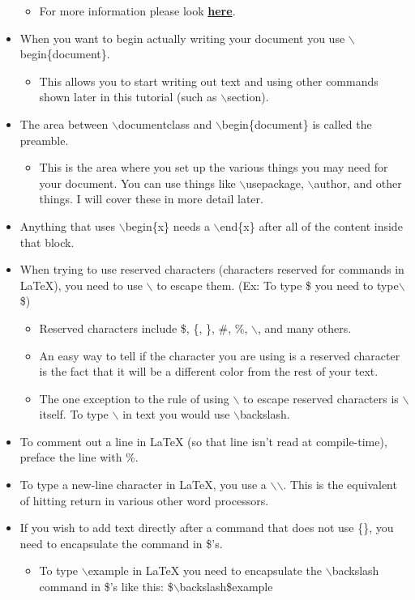 \begin{itemize}
\begin{tabularx}{\textwidth}{|l|X|}
			\hline
		\end{tabularx}
		\begin{itemize}
			\item For more information please look \href{https://en.wikibooks.org/wiki/LaTeX/Document_Structure#Document_classes}{\textbf{here}}.
		\end{itemize}
		\item When you want to begin actually writing your document you use $\backslash$begin\{document\}.
		\begin{itemize}
			\item This allows you to start writing out text and using other commands shown later in this tutorial (such as $\backslash$section).
		\end{itemize}
		\item The area between $\backslash$documentclass and $\backslash$begin\{document\} is called the preamble.
		\begin{itemize}
			\item This is the area where you set up the various things you may need for your document. You can use things like $\backslash$usepackage, $\backslash$author, and other things. I will cover these in more detail later.
		\end{itemize}
		\item Anything that uses $\backslash$begin\{x\} needs a $\backslash$end\{x\} after all of the content inside that block.
		\item When trying to use reserved characters (characters reserved for commands in \LaTeX{}), you need to use $\backslash$ to escape them. (Ex: To type \$ you need to type$\backslash$\$)
		\begin{itemize}
			\item Reserved characters include \$, \{, \}, \#, \%, $\backslash$, and many others.
			\item An easy way to tell if the character you are using is a reserved character is the fact that it will be a different color from the rest of your text.
			\item The one exception to the rule of using $\backslash$ to escape reserved characters is $\backslash$ itself. To type $\backslash$ in text you would use $\backslash$backslash.
		\end{itemize}
		\item To comment out a line in \LaTeX{} (so that line isn\rq{}t read at compile-time), preface the line with \%.
		\item To type a new-line character in \LaTeX{}, you use a $\backslash$$\backslash$. This is the equivalent of hitting return in various other word processors.
		\item If you wish to add text directly after a command that does not use \{\}, you need to encapsulate the command in \$\rq{}s.
		\begin{itemize}
			\item To type $\backslash$example in \LaTeX{} you need to encapsulate the $\backslash$backslash command in \$\rq{}s like this: \$$\backslash$backslash\$example
		\end{itemize}
	\end{itemize}

